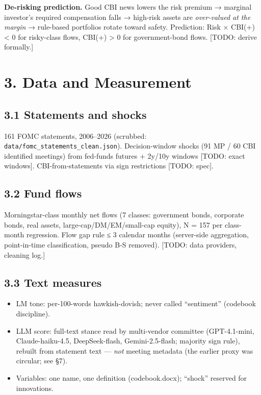 \textbf{De-risking prediction.} Good CBI news lowers the risk premium → marginal investor's required compensation falls → high-risk assets are \emph{over-valued at the margin} → rule-based portfolios rotate toward safety. Prediction: Risk × CBI(+) \textless{} 0 for risky-class flows, CBI(+) \textgreater{} 0 for government-bond flows. {[}TODO: derive formally.{]}

\section{3. Data and Measurement}\label{data-and-measurement}

\subsection{3.1 Statements and shocks}\label{statements-and-shocks}

161 FOMC statements, 2006--2026 (scrubbed: \texttt{data/fomc\_statements\_clean.json}). Decision-window shocks (91 MP / 60 CBI identified meetings) from fed-funds futures + 2y/10y windows {[}TODO: exact windows{]}. CBI-from-statements via sign restrictions {[}TODO: spec{]}.

\subsection{3.2 Fund flows}\label{fund-flows}

Morningstar-class monthly net flows (7 classes: government bonds, corporate bonds, real assets, large-cap/DM/EM/small-cap equity), N = 157 per class-month regression. Flow gap rule ≤ 3 calendar months (server-side aggregation, point-in-time classification, pseudo B-S removed). {[}TODO: data providers, cleaning log.{]}

\subsection{3.3 Text measures}\label{text-measures}

\begin{itemize}
\tightlist
\item
  LM tone: per-100-words hawkish-dovish; never called ``sentiment'' (codebook discipline).
\item
  LLM score: full-text stance read by multi-vendor committee (GPT-4.1-mini, Claude-haiku-4.5, DeepSeek-flash, Gemini-2.5-flash; majority sign rule), rebuilt from statement text --- \emph{not} meeting metadata (the earlier proxy was circular; see §7).
\item
  Variables: one name, one definition (codebook.docx); ``shock'' reserved for innovations.
\end{itemize}

